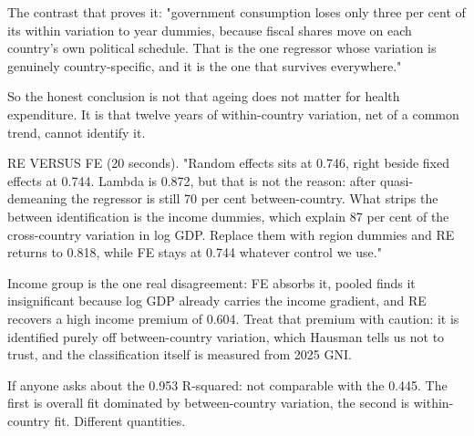 \documentclass[10pt,aspectratio=169,t]{beamer}
\begin{document}
{The contrast that proves it: "government consumption loses only three per cent
of its within variation to year dummies, because fiscal shares move on each
country's own political schedule. That is the one regressor whose variation is
genuinely country-specific, and it is the one that survives everywhere."

So the honest conclusion is not that ageing does not matter for health
expenditure. It is that twelve years of within-country variation, net of a
common trend, cannot identify it.

RE VERSUS FE (20 seconds). "Random effects sits at 0.746, right beside fixed
effects at 0.744. Lambda is 0.872, but that is not the reason: after
quasi-demeaning the regressor is still 70 per cent between-country. What strips
the between identification is the income dummies, which explain 87 per cent of
the cross-country variation in log GDP. Replace them with region dummies and RE
returns to 0.818, while FE stays at 0.744 whatever control we use."

Income group is the one real disagreement: FE absorbs it, pooled finds it
insignificant because log GDP already carries the income gradient, and RE
recovers a high income premium of 0.604. Treat that premium with caution: it is
identified purely off between-country variation, which Hausman tells us not to
trust, and the classification itself is measured from 2025 GNI.

If anyone asks about the 0.953 R-squared: not comparable with the 0.445. The
first is overall fit dominated by between-country variation, the second is
within-country fit. Different quantities.
}
\end{document}
